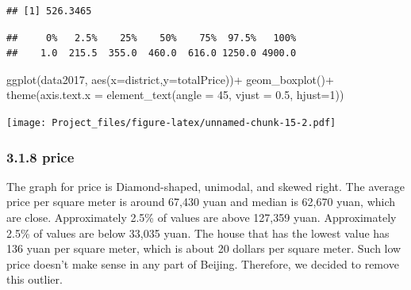 \documentclass[
]{article}
\newenvironment{Shaded}{\begin{snugshade}}{\end{snugshade}}
\newcommand{\AttributeTok}[1]{\textcolor[rgb]{0.77,0.63,0.00}{#1}}
\newcommand{\DecValTok}[1]{\textcolor[rgb]{0.00,0.00,0.81}{#1}}
\newcommand{\FloatTok}[1]{\textcolor[rgb]{0.00,0.00,0.81}{#1}}
\newcommand{\FunctionTok}[1]{\textcolor[rgb]{0.00,0.00,0.00}{#1}}
\newcommand{\NormalTok}[1]{#1}
\newcommand{\SpecialCharTok}[1]{\textcolor[rgb]{0.00,0.00,0.00}{#1}}
\begin{document}
\begin{Shaded}
\end{Shaded}

\begin{verbatim}
## [1] 526.3465
\end{verbatim}

\begin{Shaded}
\end{Shaded}

\begin{verbatim}
##     0%   2.5%    25%    50%    75%  97.5%   100% 
##    1.0  215.5  355.0  460.0  616.0 1250.0 4900.0
\end{verbatim}

\begin{Shaded}
\begin{Highlighting}[]
\FunctionTok{ggplot}\NormalTok{(data2017, }\FunctionTok{aes}\NormalTok{(}\AttributeTok{x=}\NormalTok{district,}\AttributeTok{y=}\NormalTok{totalPrice))}\SpecialCharTok{+}
  \FunctionTok{geom\_boxplot}\NormalTok{()}\SpecialCharTok{+}
  \FunctionTok{theme}\NormalTok{(}\AttributeTok{axis.text.x =} \FunctionTok{element\_text}\NormalTok{(}\AttributeTok{angle =} \DecValTok{45}\NormalTok{, }\AttributeTok{vjust =} \FloatTok{0.5}\NormalTok{, }\AttributeTok{hjust=}\DecValTok{1}\NormalTok{))}
\end{Highlighting}
\end{Shaded}

\texttt{[image: Project\_files/figure-latex/unnamed-chunk-15-2.pdf]}

\hypertarget{price}{%
\subsubsection{3.1.8 price}\label{price}}

The graph for price is Diamond-shaped, unimodal, and skewed right. The
average price per square meter is around 67,430 yuan and median is
62,670 yuan, which are close. Approximately 2.5\% of values are above
127,359 yuan. Approximately 2.5\% of values are below 33,035 yuan. The
house that has the lowest value has 136 yuan per square meter, which is
about 20 dollars per square meter. Such low price doesn't make sense in
any part of Beijing. Therefore, we decided to remove this outlier.
\end{document}
